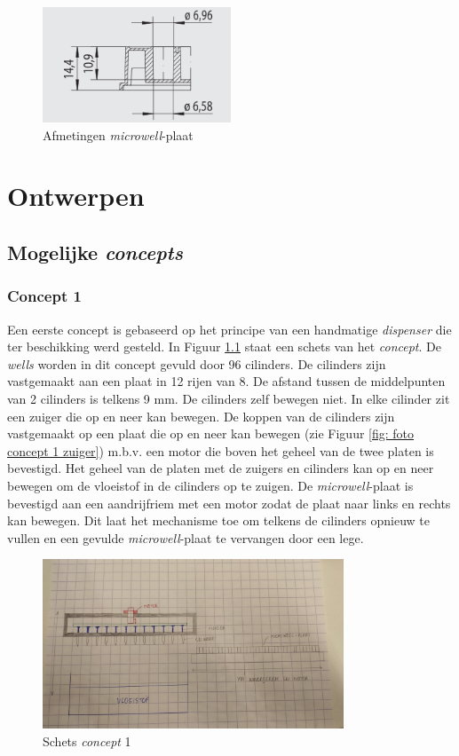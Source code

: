 \documentclass[a4paper,twoside,kulak]{kulakreport} %
\begin{document}
\begin{figure}[h]
	\centering
	\includegraphics[width=0.5\textwidth]{AfmetingenMicrowell.png}
	\caption{Afmetingen \textit{microwell}-plaat}
	\label{fig: afmetingenMicrowellplaat}
	
\end{figure} 


\chapter{Ontwerpen} 
\section{Mogelijke \textit{concepts}}
\subsection{Concept 1}
Een eerste concept is gebaseerd op het principe van een handmatige \textit{dispenser} die ter beschikking werd gesteld. In Figuur \ref{fig: schets concept 1} staat een schets van het \textit{concept}. De \textit{wells} worden in dit concept gevuld door 96 cilinders. De cilinders zijn vastgemaakt aan een plaat in 12 rijen van 8. De afstand tussen de middelpunten van 2 cilinders is telkens 9 mm. De cilinders zelf bewegen niet. In elke cilinder zit een zuiger die op en neer kan bewegen. De koppen van de cilinders zijn vastgemaakt op een plaat die op en neer kan bewegen (zie Figuur \ref{fig: foto concept 1 zuiger}) m.b.v. een motor die boven het geheel van de twee platen is bevestigd. Het geheel van de platen met de zuigers en cilinders kan op en neer bewegen om de vloeistof in de cilinders op te zuigen. De \textit{microwell}-plaat is bevestigd aan een aandrijfriem met een motor zodat de plaat naar links en rechts kan bewegen. Dit laat het mechanisme toe om telkens de cilinders opnieuw te vullen en een gevulde \textit{microwell}-plaat te vervangen door een lege.  

\begin{figure}[h]
	\centering
	\includegraphics[width=0.8\textwidth]{fotoConcept1.jpg}
	\caption{Schets \textit{concept} 1}
	\label{fig: schets concept 1}
	
\end{figure} 
\end{document}
